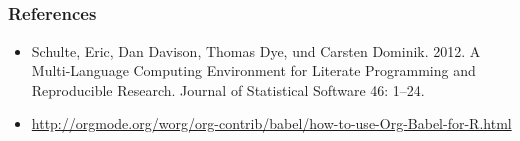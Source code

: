 \documentclass[bigger]{beamer}
\begin{document}
\subsection{}
\begin{frame}
\frametitle{References}
\label{sec-5-1-1}


\begin{itemize}
\item Schulte, Eric, Dan Davison, Thomas Dye, und Carsten Dominik. 2012. A
  Multi-Language Computing Environment for Literate Programming and Reproducible
  Research. Journal of Statistical Software 46: 1–24.
\item \href{http://orgmode.org/worg/org-contrib/babel/how-to-use-Org-Babel-for-R.html}{http://orgmode.org/worg/org-contrib/babel/how-to-use-Org-Babel-for-R.html}
\end{itemize}
\end{frame}
\end{document}
